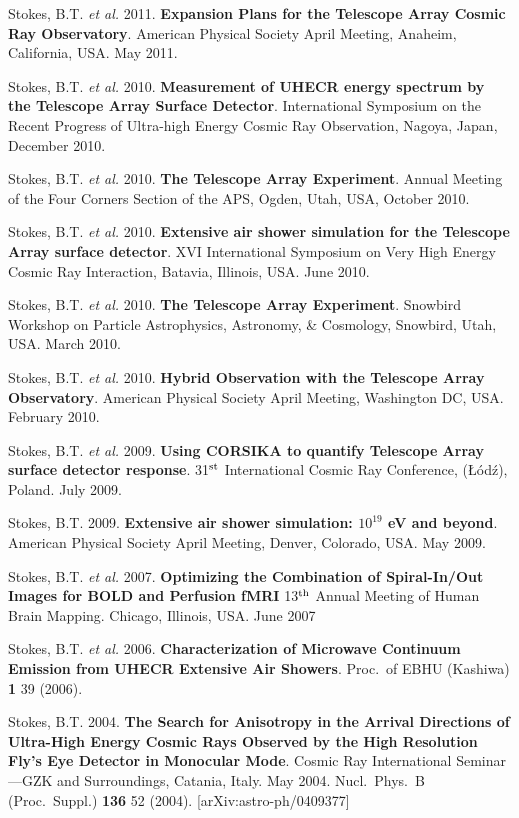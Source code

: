 \begin{resume}
Stokes, B.T. {\it et al.} 2011. {\bf Expansion Plans for the Telescope Array Cosmic Ray Observatory}. American Physical Society April Meeting, Anaheim, California, USA. May 2011. 

Stokes, B.T. {\it et al.} 2010.  {\bf Measurement of UHECR energy spectrum by the Telescope Array Surface Detector}. International Symposium on the Recent Progress of Ultra-high Energy Cosmic Ray Observation, Nagoya, Japan, December 2010.

Stokes, B.T. {\it et al.} 2010.  {\bf The Telescope Array Experiment}. Annual Meeting of the Four Corners Section of the APS, Ogden, Utah, USA, October 2010.

Stokes, B.T. {\it et al.} 2010. {\bf Extensive air shower simulation for the Telescope Array surface detector}. XVI International Symposium on Very High Energy Cosmic Ray Interaction, Batavia, Illinois, USA.  June 2010.

Stokes, B.T. {\it et al.} 2010. {\bf The Telescope Array Experiment}. Snowbird
Workshop on Particle Astrophysics, Astronomy, \& Cosmology, Snowbird, Utah, USA.
March 2010.

Stokes, B.T. {\it et al.} 2010. {\bf Hybrid Observation with the Telescope Array Observatory}. American Physical Society April Meeting, Washington DC, USA.
February 2010.

Stokes, B.T. {\it et al.} 2009. {\bf Using CORSIKA to quantify Telescope 
Array surface detector response}. 31$^{\rm st}$ International Cosmic Ray 
Conference, (\L\'od\'z), Poland. July 2009.

Stokes, B.T.  2009.  {\bf Extensive air shower simulation: \boldmath$10^{19}$ eV
and beyond}. American Physical Society April Meeting, Denver, Colorado, USA.
May 2009.

Stokes, B.T. {\it et al.} 2007. {\bf Optimizing the Combination of 
Spiral-In/Out Images for BOLD and Perfusion fMRI} 13$^{\rm th}$ Annual Meeting 
of Human Brain Mapping.  Chicago, Illinois, USA.  June 2007

Stokes, B.T. {\it et al.}  2006. 
{\bf Characterization of Microwave Continuum Emission from UHECR Extensive Air 
Showers}. Proc.\ of EBHU (Kashiwa) {\bf 1} 39 (2006).

Stokes, B.T.  2004.  {\bf The Search for Anisotropy in the Arrival 
Directions of Ultra-High Energy Cosmic Rays Observed by the High Resolution 
Fly's Eye Detector in Monocular Mode}. 
Cosmic Ray International Seminar---GZK and Surroundings, Catania, Italy.
May 2004. Nucl.\ Phys.\ B (Proc.\ Suppl.) {\bf 136} 52 (2004).
[arXiv:astro-ph/0409377]


\end{resume}
